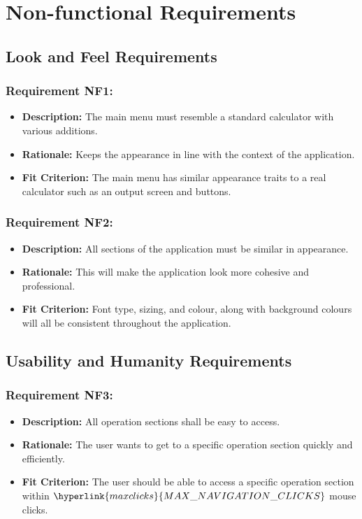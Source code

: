 \documentclass[12pt, titlepage]{article}
\begin{document}
\section{Non-functional Requirements}

\subsection{Look and Feel Requirements}
\subsubsection*{Requirement NF1:}
\begin{itemize}
  \item \textbf{Description:} The main menu must resemble a standard calculator with various additions.
  \item \textbf{Rationale:} Keeps the appearance in line with the context of the application.
  \item \textbf{Fit Criterion:} The main menu has similar appearance traits to a real calculator such as an output screen and buttons.
\end{itemize}

\subsubsection*{Requirement NF2:}
\begin{itemize}
  \item \textbf{Description:} All sections of the application must be similar in appearance.
  \item \textbf{Rationale:} This will make the application look more cohesive and professional.
  \item \textbf{Fit Criterion:} Font type, sizing, and colour, along with background colours will all be consistent throughout the application.
\end{itemize}



\subsection{Usability and Humanity Requirements}
\subsubsection*{Requirement NF3:}
\begin{itemize}
  \item \textbf{Description:} All operation sections shall be easy to access.
  \item \textbf{Rationale:} The user wants to get to a specific operation section quickly and efficiently.
  \item \textbf{Fit Criterion:} The user should be able to access a specific operation section within $\hyperlink{maxclicks}{MAX\_NAVIGATION\_CLICKS}$ mouse clicks.
\end{itemize}
\end{document}

